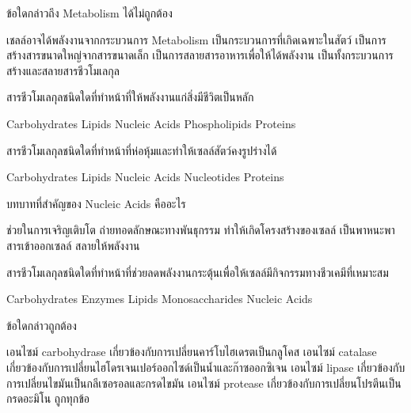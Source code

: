 \documentclass[12pt, a4paper]{exam}
\begin{document}
\begin{questions}
\filbreak
  \question ข้อใดกล่าวถึง Metabolism ได้ไม่ถูกต้อง
  \begin{choices}
    \choice เชลล์อาจได้พลังงานจากกระบวนการ Metabolism
    \choice เป็นกระบวนการที่เกิดเฉพาะในสัตว์
    \choice เป็นการสร้างสารขนาดใหญ่จากสารขนาดเล็ก
    \choice เป็นการสลายสารอาหารเพื่อให้ได้พลังงาน
    \choice เป็นทั้งกระบวนการสร้างและสลายสารชีวโมเลกุล
\end{choices}

\filbreak
  \question สารชีวโมเลกุลชนิดใดที่ทำหน้าที่ให้พลังงานแก่สิ่งมีชีวิตเป็นหลัก
  \begin{choices}
    \choice Carbohydrates
    \choice Lipids
    \choice Nucleic Acids
    \choice Phospholipids
    \choice Proteins
\end{choices}

\filbreak
  \question สารชีวโมเลกุลชนิดใดที่ทำหน้าที่ห่อหุ้มและทำให้เซลล์สัตว์คงรูปร่างได้
  \begin{choices}
    \choice Carbohydrates
    \choice Lipids
    \choice Nucleic Acids
    \choice Nucleotides
    \choice Proteins
\end{choices}

\filbreak
  \question บทบาทที่สำคัญของ Nucleic Acids คืออะไร
  \begin{choices}
    \choice ช่วยในการเจริญเติบโต
    \choice ถ่ายทอดลักษณะทางพันธุกรรม
    \choice ทำให้เกิดโครงสร้างของเซลล์
    \choice เป็นพาหนะพาสารเข้าออกเซลล์
    \choice สลายให้พลังงาน
\end{choices}

\newpage


\filbreak
  \question สารชีวโมเลกุลชนิดใดที่ทำหน้าที่ช่วยลดพลังงานกระตุ้นเพื่อให้เซลล์มีกิจกรรมทางชีวเคมีที่เหมาะสม
  \begin{choices}
    \choice Carbohydrates
    \choice Enzymes
    \choice Lipids
    \choice Monosaccharides
    \choice Nucleic Acids
\end{choices}

\filbreak
  \question ข้อใดกล่าวถูกต้อง
  \begin{choices}
    \choice เอนไซม์ carbohydrase เกี่ยวข้องกับการเปลี่ยนคาร์โบไฮเดรตเป็นกลูโคส
    \choice เอนไซม์ catalase เกี่ยวข้องกับการเปลี่ยนไฮโดรเจนเปอร์ออกไซด์เป็นน้ำและก๊าซออกซิเจน
    \choice เอนไซม์ lipase เกี่ยวข้องกับการเปลี่ยนไขมันเป็นกลีเซอรอลและกรดไขมัน
    \choice เอนไซม์ protease เกี่ยวข้องกับการเปลี่ยนโปรตีนเป็นกรดอะมิโน
    \choice ถูกทุกข้อ
\end{choices}


\end{questions}
\end{document}
